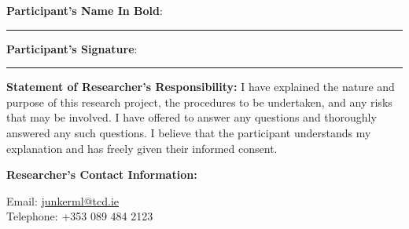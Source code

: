 \vspace{1cm}
\textbf{Participant's Name In Bold}: \rule{6cm}{1pt}

\vspace{1cm}
\textbf{Participant's Signature}: \rule{6.75cm}{1pt}

\vspace{1cm}
\textbf{Statement of Researcher's Responsibility:} I have explained the nature and purpose of this research project, the procedures to be undertaken, and any risks that may be involved. I have offered to answer any questions and thoroughly answered any such questions. I believe that the participant understands my explanation and has freely given their informed consent.


\textbf{Researcher's Contact Information:}

Email: \href{mailto:junkerml@tcd.ie}{junkerml@tcd.ie}\\
Telephone: +353 089 484 2123